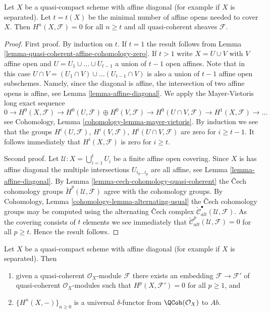 \begin{lemma}
\label{lemma-vanishing-nr-affines}
Let $X$ be a quasi-compact scheme with affine diagonal (for example
if $X$ is separated).
Let $t = t(X)$ be the minimal number of affine opens needed to
cover $X$. Then $H^n(X, \mathcal{F}) = 0$ for all $n \geq t$ and all
quasi-coherent sheaves $\mathcal{F}$.
\end{lemma}

\begin{proof}
First proof.
By induction on $t$.
If $t = 1$ the result follows from
Lemma \ref{lemma-quasi-coherent-affine-cohomology-zero}.
If $t > 1$ write $X = U \cup V$ with $V$ affine open and
$U = U_1 \cup \ldots \cup U_{t - 1}$ a union of $t - 1$ open affines.
Note that in this case
$U \cap V =  (U_1 \cap V) \cup \ldots (U_{t - 1} \cap V)$
is also a union of $t - 1$ affine open subschemes.
Namely, since the diagonal is affine, the intersection of two
affine opens is affine, see Lemma \ref{lemma-affine-diagonal}.
We apply the Mayer-Vietoris long exact sequence
$$
0 \to
H^0(X, \mathcal{F}) \to
H^0(U, \mathcal{F}) \oplus H^0(V, \mathcal{F}) \to
H^0(U \cap V, \mathcal{F}) \to
H^1(X, \mathcal{F}) \to \ldots
$$
see Cohomology, Lemma \ref{cohomology-lemma-mayer-vietoris}.
By induction we see that the groups $H^i(U, \mathcal{F})$,
$H^i(V, \mathcal{F})$, $H^i(U \cap V, \mathcal{F})$ are zero for
$i \geq t - 1$. It follows immediately that $H^i(X, \mathcal{F})$
is zero for $i \geq t$.

\medskip\noindent
Second proof.
Let $\mathcal{U} : X = \bigcup_{i = 1}^t U_i$ be a finite affine open
covering. Since $X$ is has affine diagonal the multiple intersections
$U_{i_0 \ldots i_p}$ are all affine, see
Lemma \ref{lemma-affine-diagonal}.
By Lemma \ref{lemma-cech-cohomology-quasi-coherent} the {\v C}ech
cohomology groups $\check{H}^p(\mathcal{U}, \mathcal{F})$
agree with the cohomology groups. By
Cohomology, Lemma \ref{cohomology-lemma-alternating-usual}
the {\v C}ech cohomology groups may be computed using the alternating
{\v C}ech complex $\check{\mathcal{C}}_{alt}^\bullet(\mathcal{U}, \mathcal{F})$.
As the covering consists of $t$ elements we see immediately
that $\check{\mathcal{C}}_{alt}^p(\mathcal{U}, \mathcal{F}) = 0$
for all $p \geq t$. Hence the result follows.
\end{proof}

\begin{lemma}
\label{lemma-affine-diagonal-universal-delta-functor}
Let $X$ be a quasi-compact scheme with affine diagonal
(for example if $X$ is separated). Then
\begin{enumerate}
\item given a quasi-coherent $\mathcal{O}_X$-module $\mathcal{F}$
there exists an embedding $\mathcal{F} \to \mathcal{F}'$ of
quasi-coherent $\mathcal{O}_X$-modules
such that $H^p(X, \mathcal{F}') = 0$ for all $p \geq 1$, and
\item $\{H^n(X, -)\}_{n \geq 0}$
is a universal $\delta$-functor from $\QCoh(\mathcal{O}_X)$ to
$\textit{Ab}$.
\end{enumerate}
\end{lemma}

